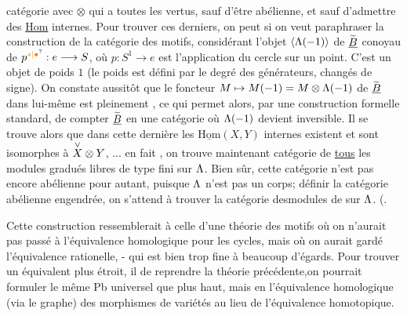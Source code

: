 catégorie  avec $\otimes$ qui a toutes les vertus, sauf d'être abélienne, et sauf d'admettre des \uline{Hom} internes. Pour trouver ces derniers, on peut si on veut paraphraser la construction de la catégorie des motifs,    considérant l'objet $\inserted{\handwritten{\Lambda}(-1)}$ de $\widetilde{\underline B}$ conoyau de $p^{\handwritten{\unsure{*|\bullet}}}:e\longrightarrow S$, où $p:S^1\longrightarrow e$ est l'application du cercle sur un point. C'est un objet de poids $1$ (le poids est défini par le degré  des générateurs, changés de signe). On constate aussitôt que le foncteur $M\mapsto M(-1)=M\otimes\Lambda(-1)$ de $\widetilde{\underline B}$ dans lui-même est pleinement , ce qui permet alors, par une construction formelle standard, de compter $\widetilde{\underline B}$ en une catégorie où $\Lambda(-1)$ devient inversible. Il se trouve alors que dans cette dernière les $\underline{\mathrm{Hom}}(X,Y)$ internes existent et  sont isomorphes à $\overset{\vee}X\otimes Y$, ... en fait , on trouve maintenant  catégorie de \uline{tous} les modules gradués libres de type fini sur $\Lambda$. Bien sûr, cette catégorie n'est pas encore abélienne pour autant, puisque $\Lambda$ n'est pas un corps;  définir la catégorie abélienne engendrée, on s'attend à trouver la catégorie desmodules de    sur $\Lambda$. (.

Cette construction ressemblerait à celle d'une théorie des motifs où on n'aurait pas passé à l'équivalence homologique pour les cycles, mais où on aurait gardé l'équivalence rationelle, - qui est bien trop fine à beaucoup d'égards. Pour trouver un équivalent plus étroit, il  de reprendre la théorie précédente,on pourrait formuler le même Pb universel que plus haut, mais en  l'équivalence homologique (via le graphe) des morphismes de variétés au lieu de l'équivalence homotopique. 


